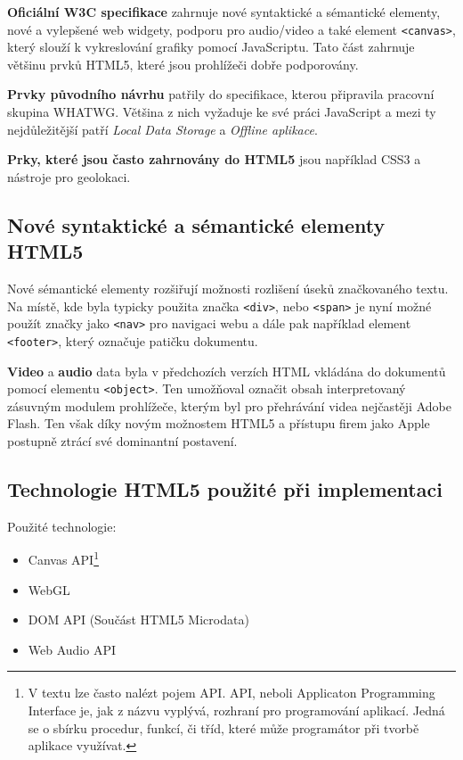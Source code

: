 \textbf{Oficiální W3C specifikace} zahrnuje nové syntaktické a sémantické elementy, nové a vylepšené web widgety, podporu pro audio/video a také element \texttt{<canvas>}, který slouží k vykreslování grafiky pomocí JavaScriptu. Tato část zahrnuje většinu prvků HTML5, které jsou prohlížeči dobře podporovány. 

\textbf{Prvky původního návrhu} patřily do specifikace, kterou připravila pracovní skupina WHATWG. Většina z nich vyžaduje ke své práci JavaScript a mezi ty nejdůležitější patří \textit{Local Data Storage} a \textit{Offline aplikace}. 

\textbf{Prky, které jsou často zahrnovány do HTML5} jsou například CSS3 a nástroje pro geolokaci.



\subsection*{Nové syntaktické a sémantické elementy HTML5}
\label{subsection:newElementsHTML5}
Nové sémantické elementy rozšiřují možnosti rozlišení úseků značkovaného textu. Na místě, kde byla typicky použita značka \texttt{<div>}, nebo \texttt{<span>} je nyní možné použít značky jako \texttt{<nav>} pro navigaci webu a dále pak například element \texttt{<footer>}, který označuje patičku dokumentu. 

\textbf{Video} a \textbf{audio} data byla v předchozích verzích HTML vkládána do dokumentů pomocí elementu \texttt{<object>}. Ten umožňoval označit obsah interpretovaný zásuvným modulem prohlížeče, kterým byl pro přehrávání videa nejčastěji Adobe Flash. Ten však díky novým možnostem HTML5 a přístupu firem jako Apple postupně ztrácí své dominantní postavení.

\pagebreak

\subsection*{Technologie HTML5 použité při implementaci}
\label{subsection:html5aImplementace}
Použité technologie:

\begin{itemize}
\item Canvas API\footnote{V textu lze často nalézt pojem API. API, neboli Applicaton Programming Interface je, jak z názvu vyplývá, rozhraní pro programování aplikací. Jedná se o sbírku procedur, funkcí, či tříd, které může programátor při tvorbě aplikace využívat.} 
\item WebGL
\item DOM API (Součást HTML5 Microdata)
\item Web Audio API
\end{itemize}

